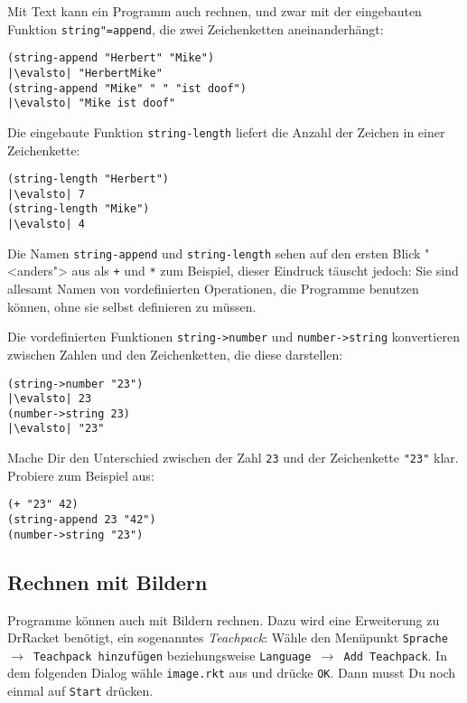 Mit Text kann ein Programm auch rechnen, und zwar mit der eingebauten
Funktion
\texttt{string"=append},
die zwei Zeichenketten aneinanderhängt:
%
\begin{lstlisting}
(string-append "Herbert" "Mike")
|\evalsto| "HerbertMike"
(string-append "Mike" " " "ist doof")
|\evalsto| "Mike ist doof"
\end{lstlisting}
%
Die eingebaute Funktion
\lstinline{string-length}
liefert die Anzahl der Zeichen in einer Zeichenkette:
%
\begin{lstlisting}
(string-length "Herbert")
|\evalsto| 7
(string-length "Mike")
|\evalsto| 4
\end{lstlisting}
%
Die Namen \lstinline{string-append} und \lstinline{string-length} sehen auf
den ersten Blick "<anders"> aus als \lstinline{+} und \lstinline{*} zum
Beispiel, dieser Eindruck täuscht jedoch: Sie sind allesamt Namen von
vordefinierten Operationen, die Programme benutzen können, ohne sie
selbst definieren zu müssen.

Die vordefinierten Funktionen
\lstinline{string->number}
und \lstinline{number->string} konvertieren zwischen Zahlen und den
Zeichenketten, die diese darstellen:
%
\begin{lstlisting}
(string->number "23")
|\evalsto| 23
(number->string 23)
|\evalsto| "23"
\end{lstlisting}
%
\begin{aufgabeinline}
  Mache Dir den Unterschied zwischen der Zahl \lstinline{23} und der
  Zeichenkette \lstinline{"23"} klar.  Probiere zum Beispiel aus:
\begin{lstlisting}
(+ "23" 42)
(string-append 23 "42")
(number->string "23")
\end{lstlisting}
\end{aufgabeinline}

\subsection{Rechnen mit Bildern}
\label{sec:rechnen-mit-bildern}

Programme können auch mit Bildern rechnen.  Dazu wird eine Erweiterung
zu DrRacket benötigt, ein sogenanntes
\textit{Teachpack}: Wähle den Menüpunkt
\texttt{Sprache $\rightarrow$ Teachpack hinzufügen} beziehungsweise
\texttt{Language $\rightarrow$ Add Teachpack}.  In dem folgenden Dialog
wähle \texttt{image.rkt} aus und drücke 
\texttt{OK}.  Dann musst Du noch einmal auf \texttt{Start} drücken.

